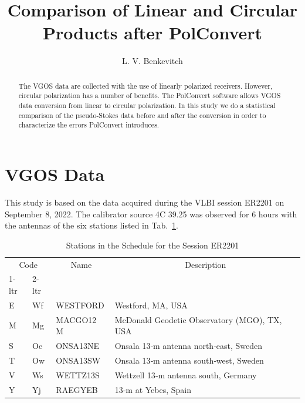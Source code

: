 \documentclass[letterpaper,twoside,12pt]{article}
\title{Comparison of Linear and Circular Products after PolConvert}
\author[1]{L. V. Benkevitch}
\affil[1]{\small MIT Haystack observatory, Westford, MA 01886, USA.}
\begin{document}
\maketitle

\begin{abstract}

The VGOS data are collected with the use of linearly polarized receivers. However, circular polarization has a number of benefits. The PolConvert software allows VGOS data conversion from linear to circular polarization. In this study we do a statistical comparison of the pseudo-Stokes data before and after the conversion in order to characterize the errors PolConvert introduces.

\end{abstract}


\tableofcontents

\section{VGOS Data}

This study is based on the data acquired during the VLBI session ER2201 on September 8, 2022. The calibrator source 4C 39.25 was observed for 6 hours with the antennas of the six stations listed in Tab.~\ref{stations}.

\begin{table}[ht!]
  \begin{center}
    \caption{Stations in the Schedule for the Session ER2201}
    \label{stations}
    \begin{tabular}{l|l|l|l}
    \multicolumn{2}{c|}{Code} & \multicolumn{1}{c|}{Name} & \multicolumn{1}{c}{Description} \\                       %
     1-ltr & 2-ltr &  &  \\
      \hline
E & Wf & WESTFORD  & Westford, MA, USA \\
M & Mg & MACGO12 M & McDonald Geodetic Observatory (MGO), TX, USA \\
S & Oe & ONSA13NE  & Onsala 13‐m antenna north‐east, Sweden \\
T & Ow & ONSA13SW  & Onsala 13‐m antenna south‐west, Sweden \\
V & Ws & WETTZ13S  & Wettzell 13‐m antenna south, Germany \\
Y & Yj & RAEGYEB   & 13‐m at Yebes, Spain
    \end{tabular}
  \end{center}
\end{table}
  
\end{document}
